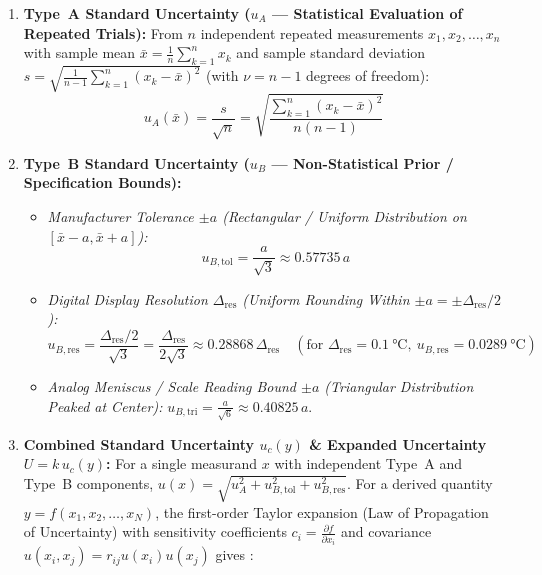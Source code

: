 \begin{enumerate}
  \item \textbf{Type~A Standard Uncertainty ($u_A$ --- Statistical Evaluation of Repeated Trials):}
  From $n$ independent repeated measurements $x_1, x_2, \dots, x_n$ with sample mean $\bar{x} = \frac{1}{n}\sum_{k=1}^n x_k$ and sample standard deviation $s = \sqrt{\frac{1}{n-1}\sum_{k=1}^n (x_k - \bar{x})^2}$ (with $\nu = n - 1$ degrees of freedom):
  \begin{equation}\label{eq:17:typeA}
    u_A(\bar{x}) = \frac{s}{\sqrt{n}} = \sqrt{\frac{\sum_{k=1}^n (x_k - \bar{x})^2}{n(n - 1)}}
  \end{equation}
  \item \textbf{Type~B Standard Uncertainty ($u_B$ --- Non-Statistical Prior / Specification Bounds):}
  \begin{itemize}
    \item \emph{Manufacturer Tolerance $\pm a$ (Rectangular / Uniform Distribution on $[\bar{x}-a, \bar{x}+a]$):}
    \begin{equation}\label{eq:17:typeBtol}
      u_{B,\mathrm{tol}} = \frac{a}{\sqrt{3}} \approx 0.57735\,a
    \end{equation}
    \item \emph{Digital Display Resolution $\Delta_{\mathrm{res}}$ (Uniform Rounding Within $\pm a = \pm\Delta_{\mathrm{res}}/2$):}
    \begin{equation}\label{eq:17:typeBres}
      u_{B,\mathrm{res}} = \frac{\Delta_{\mathrm{res}} / 2}{\sqrt{3}} = \frac{\Delta_{\mathrm{res}}}{2\sqrt{3}} \approx 0.28868\,\Delta_{\mathrm{res}} \quad (\text{for }\Delta_{\mathrm{res}} = \SI{0.1}{\celsius},\ u_{B,\mathrm{res}} = \SI{0.0289}{\celsius})
    \end{equation}
    \item \emph{Analog Meniscus / Scale Reading Bound $\pm a$ (Triangular Distribution Peaked at Center):} $u_{B,\mathrm{tri}} = \frac{a}{\sqrt{6}} \approx 0.40825\,a$.
  \end{itemize}
  \item \textbf{Combined Standard Uncertainty $u_c(y)$ \& Expanded Uncertainty $U = k\,u_c(y)$:}
  For a single measurand $x$ with independent Type~A and Type~B components, $u(x) = \sqrt{u_A^2 + u_{B,\mathrm{tol}}^2 + u_{B,\mathrm{res}}^2}$. For a derived quantity $y = f(x_1, x_2, \dots, x_N)$, the first-order Taylor expansion (Law of Propagation of Uncertainty) with sensitivity coefficients $c_i = \frac{\partial f}{\partial x_i}$ and covariance $u(x_i, x_j) = r_{ij}u(x_i)u(x_j)$ gives :

\end{enumerate}
